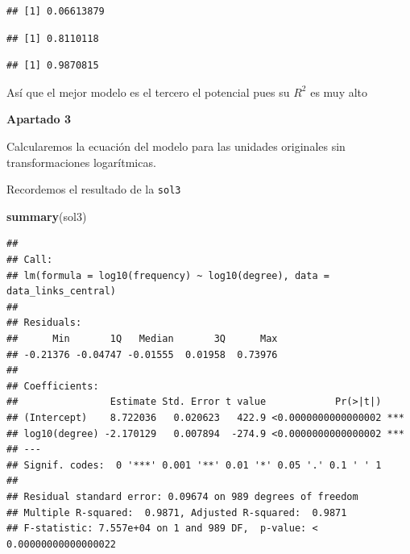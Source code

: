 \documentclass[
]{article}
\newenvironment{Shaded}{\begin{snugshade}}{\end{snugshade}}
\newcommand{\KeywordTok}[1]{\textcolor[rgb]{0.13,0.29,0.53}{\textbf{#1}}}
\newcommand{\NormalTok}[1]{#1}
\newcommand{\OperatorTok}[1]{\textcolor[rgb]{0.81,0.36,0.00}{\textbf{#1}}}
\begin{document}
\begin{verbatim}
## [1] 0.06613879
\end{verbatim}

\begin{Shaded}
\end{Shaded}

\begin{verbatim}
## [1] 0.8110118
\end{verbatim}

\begin{Shaded}
\end{Shaded}

\begin{verbatim}
## [1] 0.9870815
\end{verbatim}

Así que el mejor modelo es el tercero el potencial pues su \(R^2\) es
muy alto

\textbf{Apartado 3}

Calcularemos la ecuación del modelo para las unidades originales sin
transformaciones logarítmicas.

Recordemos el resultado de la \texttt{sol3}

\begin{Shaded}
\begin{Highlighting}[]
\KeywordTok{summary}\NormalTok{(sol3)}
\end{Highlighting}
\end{Shaded}

\begin{verbatim}
## 
## Call:
## lm(formula = log10(frequency) ~ log10(degree), data = data_links_central)
## 
## Residuals:
##      Min       1Q   Median       3Q      Max 
## -0.21376 -0.04747 -0.01555  0.01958  0.73976 
## 
## Coefficients:
##                Estimate Std. Error t value            Pr(>|t|)    
## (Intercept)    8.722036   0.020623   422.9 <0.0000000000000002 ***
## log10(degree) -2.170129   0.007894  -274.9 <0.0000000000000002 ***
## ---
## Signif. codes:  0 '***' 0.001 '**' 0.01 '*' 0.05 '.' 0.1 ' ' 1
## 
## Residual standard error: 0.09674 on 989 degrees of freedom
## Multiple R-squared:  0.9871, Adjusted R-squared:  0.9871 
## F-statistic: 7.557e+04 on 1 and 989 DF,  p-value: < 0.00000000000000022
\end{verbatim}
\end{document}
